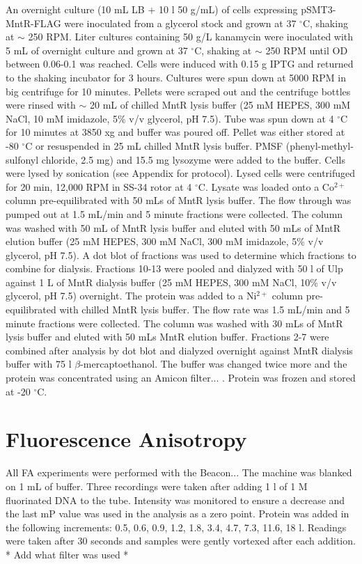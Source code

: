 \documentclass[12pt,twoside]{reedthesis}
\begin{document}
An overnight culture (10 mL LB + 10 \micro l 50 \micro g/mL) of cells expressing pSMT3-MntR-FLAG were inoculated from a glycerol stock and grown at 37 $^\circ$C, shaking at $\sim$ 250 RPM. Liter cultures containing 50 \micro g/L kanamycin were inoculated with 5 mL of overnight culture and grown at 37 $^\circ$C, shaking at $\sim$ 250 RPM until OD between 0.06-0.1 was reached. Cells were induced with 0.15 g IPTG and returned to the shaking incubator for 3 hours. Cultures were spun down at 5000 RPM in big centrifuge for 10 minutes. Pellets were scraped out and the centrifuge bottles were rinsed with $\sim$ 20 mL of chilled MntR lysis buffer (25 mM HEPES, 300 mM NaCl, 10 mM imidazole, 5\% v/v glycerol, pH 7.5). Tube was spun down at 4 $^\circ$C for 10 minutes at 3850 xg and buffer was poured off. Pellet was either stored at -80 $^\circ$C or resuspended in 25 mL chilled MntR lysis buffer. PMSF (phenyl-methyl-sulfonyl chloride, 2.5 mg) and 15.5 mg lysozyme were added to the buffer. Cells were lysed by sonication (see Appendix for protocol). Lysed cells were centrifuged for 20 min, 12,000 RPM in SS-34 rotor at 4 $^\circ$C. Lysate was loaded onto a Co$^{2+}$ column pre-equilibrated with 50 mLs of MntR lysis buffer. The flow through was pumped out at 1.5 mL/min and 5 minute fractions were collected. The column was washed with 50 mL of MntR lysis buffer and eluted with 50 mLs of MntR elution buffer (25 mM HEPES, 300 mM NaCl, 300 mM imidazole, 5\% v/v glycerol, pH 7.5). A dot blot of fractions was used to determine which fractions to combine for dialysis. Fractions 10-13 were pooled and dialyzed with 50 \micro l of Ulp against 1 L of MntR dialysis buffer (25 mM HEPES, 300 mM NaCl, 10\% v/v glycerol, pH 7.5) overnight. The protein was added to a Ni$^{2+}$ column pre-equilibrated with chilled MntR lysis buffer. The flow rate was 1.5 mL/min and 5 minute fractions were collected. The column was washed with 30 mLs of MntR lysis buffer and eluted with 50 mLs MntR elution buffer. Fractions 2-7 were combined after analysis by dot blot and dialyzed overnight against MntR dialysis buffer with 75 \micro l $\beta$-mercaptoethanol. The buffer was changed twice more and the protein was concentrated using an Amicon filter... . Protein was frozen and stored at -20 $^{\circ}$C. 


\section{Fluorescence Anisotropy}
All FA experiments were performed with the Beacon... The machine was blanked on 1 mL of buffer. Three recordings were taken after adding 1 \micro l of 1 \micro M fluorinated DNA to the tube. Intensity was monitored to ensure a decrease and the last mP value was used in the analysis as a zero point. Protein was added in the following increments: 0.5, 0.6, 0.9, 1.2, 1.8, 3.4, 4.7, 7.3, 11.6, 18 \micro l. Readings were taken after 30 seconds and samples were gently vortexed after each addition. * Add what filter was used *  
\end{document}
